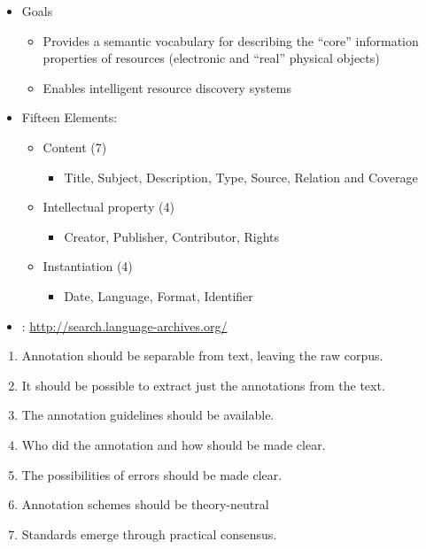 \documentclass[a4paper,landscape,headrule,footrule,xetex]{foils}
\begin{document}
\begin{itemize}
\item Goals
  \begin{itemize}
  \item Provides a semantic vocabulary for describing the
    ``core'' information properties of resources (electronic
    and ``real'' physical objects)
  \item Enables intelligent resource discovery systems
  \end{itemize}
\item Fifteen Elements:
  \begin{itemize}
  \item Content (7)
    \begin{itemize}
    \item Title, Subject, Description, Type, Source,
      Relation and Coverage
    \end{itemize}
  \item Intellectual property (4)
    \begin{itemize}
    \item Creator, Publisher, Contributor, Rights
    \end{itemize}
  \item Instantiation (4)
    \begin{itemize}
    \item Date, Language, Format, Identifier
    \end{itemize}
  \end{itemize}
\item {}: {\small \url{http://search.language-archives.org/}}
\end{itemize}



\MyLogo{}
\begin{enumerate}
\item Annotation should be separable from text, leaving the raw corpus.
\item It should be possible to extract just the annotations
from the text. 
\item The annotation guidelines should be available.
\item Who did the annotation and how should be made clear.
\item The possibilities of errors should be made clear.
\item Annotation schemes should be theory-neutral 
\item Standards emerge through practical consensus.
\end{enumerate}
\end{document}
